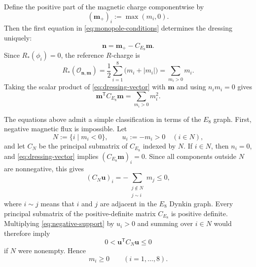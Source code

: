 \documentclass[11pt,a4paper]{article}
\numberwithin{equation}{section}
\begin{document}
Define the positive part of the magnetic charge componentwise by
\begin{equation}
  (\boldsymbol m_+)_i:=\max(m_i,0).
  \label{eq:positive-part}
\end{equation}
Then the first equation in \eqref{eq:monopole-conditions} determines the dressing uniquely:
\begin{equation}
  \boldsymbol n=\boldsymbol m_+-C_{E_8}\boldsymbol m.
  \label{eq:dressing-vector}
\end{equation}
Since $R_*(\phi_i)=0$, the reference $R$-charge is
\begin{equation}
  R_*(\mathcal O_{\boldsymbol n,\boldsymbol m})
  =\frac12\sum_{i=1}^{8}\bigl(m_i+|m_i|\bigr)
  =\sum_{m_i>0}m_i.
  \label{eq:monopole-Rstar}
\end{equation}
Taking the scalar product of \eqref{eq:dressing-vector} with $\boldsymbol m$ and using $n_i m_i=0$ gives
\begin{equation}
  \boldsymbol m^{\mathsf T}C_{E_8}\boldsymbol m
  =\sum_{m_i>0}m_i^2.
  \label{eq:monopole-norm-identity}
\end{equation}

The equations above admit a simple classification in terms of the $E_8$ graph.  First, negative magnetic flux is impossible.  Let
\begin{equation}
  N:=\{i\mid m_i<0\},
  \qquad
  u_i:=-m_i>0\quad(i\in N),
\end{equation}
and let $C_N$ be the principal submatrix of $C_{E_8}$ indexed by $N$.  If $i\in N$, then $n_i=0$, and \eqref{eq:dressing-vector} implies $(C_{E_8}\boldsymbol m)_i=0$.  Since all components outside $N$ are nonnegative, this gives
\begin{equation}
  (C_N\boldsymbol u)_i
  =-\sum_{\substack{j\notin N\\ j\sim i}}m_j
  \leq0,
  \label{eq:negative-support}
\end{equation}
where $i\sim j$ means that $i$ and $j$ are adjacent in the $E_8$ Dynkin graph.  Every principal submatrix of the positive-definite matrix $C_{E_8}$ is positive definite.  Multiplying \eqref{eq:negative-support} by $u_i>0$ and summing over $i\in N$ would therefore imply
\begin{equation}
  0<\boldsymbol u^{\mathsf T}C_N\boldsymbol u\leq0
\end{equation}
if $N$ were nonempty.  Hence
\begin{equation}
  m_i\geq0
  \qquad(i=1,\ldots,8).
  \label{eq:nonnegative-flux}
\end{equation}
\end{document}
